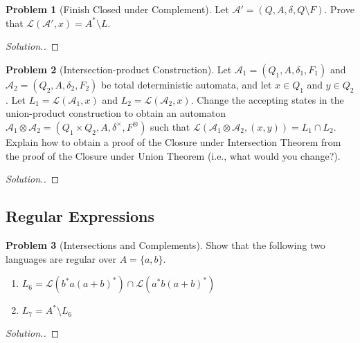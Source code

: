 \documentclass[11pt]{article}
\theoremstyle{theorem} %
\theoremstyle{definition} %
\newtheorem{problem}                    {{\color{BurntOrange}Problem}}
\theoremstyle{remark} %
\begin{document}
\begin{problem}
    [Finish Closed under Complement]
    Let \(\mathcal A' = (Q, A, \delta, Q\setminus F)\).
    Prove that \(\mathcal L(\mathcal A', x) = A^* \setminus L\).
\end{problem}

\begin{proof}[Solution.]
    
\end{proof}

\begin{problem}
    [Intersection-product Construction]
    Let \(\mathcal A_1 = (Q_1, A, \delta_1, F_1)\) and \(\mathcal A_2 = (Q_2, A, \delta_2, F_2)\) be total deterministic automata, and let \(x \in Q_1\) and \(y \in Q_2\).
    Let \(L_1 = \mathcal L(\mathcal A_1, x)\) and \(L_2 = \mathcal L(\mathcal A_2, x)\).
    Change the accepting states in the union-product construction to obtain an automaton \(\mathcal A_1 \otimes \mathcal A_2 = (Q_1 \times Q_2, A, \delta^\times, F^
    \otimes)\) such that \(\mathcal L(\mathcal A_1 \otimes \mathcal A_2, (x, y)) = L_1 \cap L_2\).
    Explain how to obtain a proof of the Closure under Intersection Theorem from the proof of the Closure under Union Theorem (i.e., what would you change?).
\end{problem}

\begin{proof}[Solution.]
    
\end{proof}

\subsection*{Regular Expressions}

\begin{problem}
    [Intersections and Complements]
    Show that the following two languages are regular over \(A = \{a, b\}\). 
    \begin{enumerate}
        \item \(L_6 = \mathcal L(b^*a(a + b)^*) \cap \mathcal L(a^*b(a + b)^*)\)
        \item \(L_7 = A^* \setminus L_6\)
    \end{enumerate}
\end{problem}

\begin{proof}[Solution.]
    
\end{proof}
\end{document}
